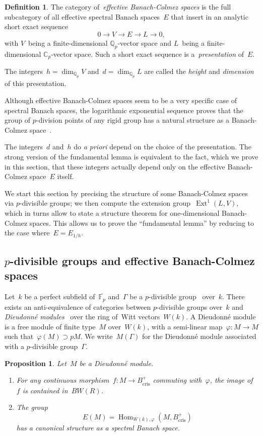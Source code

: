 \documentclass{article}
\newtheorem{prop}[thm]{Proposition}
\theoremstyle{definition}
\newtheorem{df}[thm]{Definition}
\DeclareMathOperator\Hom{Hom}
\DeclareMathOperator\Ext{Ext}
\def\cris{_{\mathrm{cris}}}
\def\Fpb{{\overline{\mathbb{F}_p}}}
\def\Cp{{ℂ_p}}
\begin{document}
\begin{df}
The category of~\emph{effective Banach-Colmez spaces} is the full
subcategory of all effective spectral Banach spaces~$E$ that insert in an
analytic short exact sequence
\begin{equation} \label{eq:pres}
0 → V → E → L → 0,
\end{equation}
with $V$~being a finite-dimensional $ℚ_p$-vector space and $L$~being a
finite-dimensional $\Cp$-vector space. Such a short exact sequence is
a~\emph{presentation} of~$E$.

The integers~$h = \dim_{ℚ_p} V$ and~$d =
\dim_{ℚ_p} L$ are called the \emph{height} and \emph{dimension} of this
presentation.
\end{df}

Although effective Banach-Colmez spaces seem to be
a very specific case of spectral Banach spaces,
the logarithmic exponential sequence proves that the group of
$p$-division points of any rigid group has a natural structure as
a Banach-Colmez space~\cite[7.32]{FF2011Courbes}.

The integers~$d$ and~$h$ do \emph{a priori} depend on the choice of the
presentation.
The strong version of the fundamental lemma is equivalent to the fact,
which we prove in this section,
that these integers actually depend only on the effective Banach-Colmez
space~$E$ itself.

We start this section by precising the structure of
some Banach-Colmez spaces via $p$-divisible groups;
we then compute the extension group~$\Ext^1(L, V)$,
which in turns allow to state a structure theorem for
one-dimensional Banach-Colmez spaces.
This allows us to prove the “fundamental lemma” by reducing
to the case where~$E = E_{1/h}$.
\subsection{$p$-divisible groups and effective Banach-Colmez spaces}

Let~$k$ be a perfect subfield of~$\Fpb$
and~$Γ$ be a $p$-divisible group~\cite[II.11]{Demazure1972} over~$k$.
There exists an anti-equivalence of categories between
$p$-divisible groups over~$k$
and \emph{Dieudonné modules}~\cite[III.8]{Demazure1972}
over the ring of~Witt vectors~$W(k)$.
A Dieudonné module is a free module of finite type~$M$ over~$W(k)$, with a
semi-linear map~$φ: M → M$ such that~$φ(M) ⊃ p M$.
We write~$M(Γ)$ for the Dieudonné module associated with
a $p$-divisible group~$Γ$.

\begin{prop}\label{prop:dieud-BW}
Let~$M$ be a Dieudonné module.
\begin{enumerate}
\item For any continuous morphism~$f: M → B^+\cris$ commuting with~$φ$,
the image of~$f$ is contained in~$BW(R)$.
\item The group
\[ E(M) = \Hom_{W(k), φ} (M, B^+\cris) \]
has a canonical structure as a spectral Banach space.
\end{enumerate}
\end{prop}%
\end{document}
